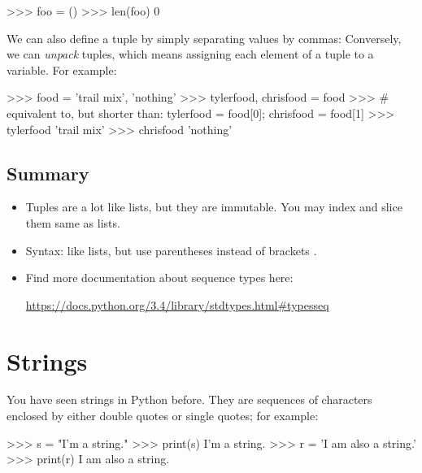 \documentclass[11pt]{cselabheader}
\begin{document}
\begin{pyconcode}
>>> foo = ()
>>> len(foo)
0
\end{pyconcode}

We can also define a tuple by simply separating values by commas:
Conversely, we can \emph{unpack} tuples, which means assigning each element of
a tuple to a variable. For example:

\begin{pyconcode}
>>> food = 'trail mix', 'nothing'
>>> tylerfood, chrisfood = food
>>> # equivalent to, but shorter than: tylerfood = food[0]; chrisfood = food[1]
>>> tylerfood
'trail mix'
>>> chrisfood
'nothing'
\end{pyconcode}

\vspace{-2.5em} %
\subsection{Summary}

\begin{itemize}
  \item Tuples are a lot like lists, but they are immutable. You may index and
      slice them same as lists.

  \item Syntax: like lists, but use parentheses \pythoninline{()} instead of
    brackets \pythoninline{[]}.

  \item Find more documentation about sequence types here:

    \begin{center}
      \url{https://docs.python.org/3.4/library/stdtypes.html#typesseq}
    \end{center}
\end{itemize}

\pagebreak
\section{Strings}

You have seen strings in Python before. They are sequences of characters
enclosed by either double quotes or single quotes; for example:

\begin{pyconcode}
>>> s = "I'm a string."
>>> print(s)
I'm a string.
>>> r = 'I am also a string.'
>>> print(r)
I am also a string.
\end{pyconcode}
\end{document}
